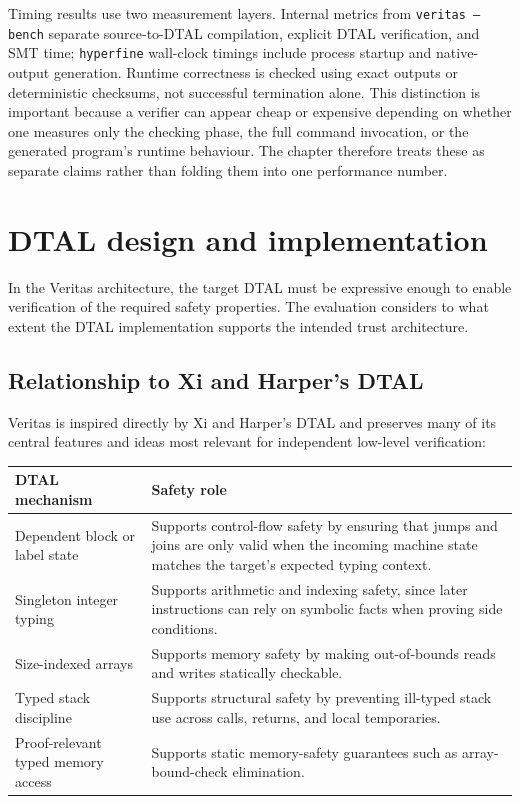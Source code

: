 Timing results use two measurement layers. Internal metrics from \texttt{veritas --bench} separate source-to-DTAL compilation, explicit DTAL verification, and SMT time; \texttt{hyperfine} wall-clock timings include process startup and native-output generation. Runtime correctness is checked using exact outputs or deterministic checksums, not successful termination alone. This distinction is important because a verifier can appear cheap or expensive depending on whether one measures only the checking phase, the full command invocation, or the generated program's runtime behaviour. The chapter therefore treats these as separate claims rather than folding them into one performance number.

\section{DTAL design and implementation}\label{sec:dtal-eval}

In the Veritas architecture, the target DTAL must be expressive enough to enable verification of the required safety properties. The evaluation considers to what extent the DTAL implementation supports the intended trust architecture.

\subsection{Relationship to Xi and Harper's DTAL}

Veritas is inspired directly by Xi and Harper's DTAL and preserves many of its central features and ideas most relevant for independent low-level verification:

\begin{center}
\small
\begin{tabularx}{0.96\textwidth}{>{\raggedright\arraybackslash}p{} >{\raggedright\arraybackslash}X}
\toprule
\textbf{DTAL mechanism} & \textbf{Safety role} \\
\midrule
Dependent block or label state & Supports control-flow safety by ensuring that jumps and joins are only valid when the incoming machine state matches the target's expected typing context. \\
Singleton integer typing & Supports arithmetic and indexing safety, since later instructions can rely on symbolic facts when proving side conditions. \\
Size-indexed arrays & Supports memory safety by making out-of-bounds reads and writes statically checkable. \\
Typed stack discipline & Supports structural safety by preventing ill-typed stack use across calls, returns, and local temporaries. \\
Proof-relevant typed memory access & Supports static memory-safety guarantees such as array-bound-check elimination. \\
\bottomrule
\end{tabularx}
\end{center}

